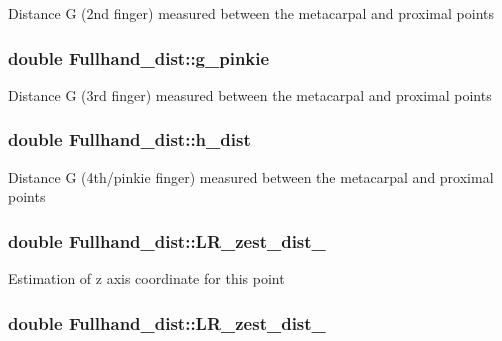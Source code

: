 \label{classFullhand__dist_af639475219dd57fb310655b1394b7a70}
Distance G (2nd finger) measured between the metacarpal and proximal points \hypertarget{classFullhand__dist_ad56ca15f4e4277d84014be5bf29f370f}{
\subsubsection[{g\_\-pinkie}]{\setlength{\rightskip}{0pt plus 5cm}double {\bf Fullhand\_\-dist::g\_\-pinkie}}}
\label{classFullhand__dist_ad56ca15f4e4277d84014be5bf29f370f}
Distance G (3rd finger) measured between the metacarpal and proximal points \hypertarget{classFullhand__dist_a08af1cb10cf3e148fa45c25afbebc8dd}{
\subsubsection[{h\_\-dist}]{\setlength{\rightskip}{0pt plus 5cm}double {\bf Fullhand\_\-dist::h\_\-dist}}}
\label{classFullhand__dist_a08af1cb10cf3e148fa45c25afbebc8dd}
Distance G (4th/pinkie finger) measured between the metacarpal and proximal points \hypertarget{classFullhand__dist_afcab0a3f5c9e706a005d624ba1814f12}{
\subsubsection[{LR\_\-zest\_\-dist\_\-1}]{\setlength{\rightskip}{0pt plus 5cm}double {\bf Fullhand\_\-dist::LR\_\-zest\_\-dist\_}}}
\label{classFullhand__dist_afcab0a3f5c9e706a005d624ba1814f12}
Estimation of z axis coordinate for this point \hypertarget{classFullhand__dist_a966a00021c37af0b1275c712dcd18540}{
\subsubsection[{LR\_\-zest\_\-dist\_\-2}]{\setlength{\rightskip}{0pt plus 5cm}double {\bf Fullhand\_\-dist::LR\_\-zest\_\-dist\_}}}
\label{classFullhand__dist_a966a00021c37af0b1275c712dcd18540}
